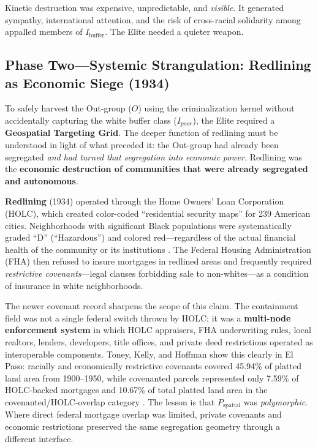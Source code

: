 Kinetic destruction was expensive, unpredictable, and \textit{visible}. It generated sympathy, international attention, and the risk of cross-racial solidarity among appalled members of $I_{\text{buffer}}$. The Elite needed a quieter weapon.

\subsection{Phase Two---Systemic Strangulation: Redlining as Economic Siege (1934)}

To safely harvest the Out-group ($O$) using the criminalization kernel without accidentally capturing the white buffer class ($I_{poor}$), the Elite required a \textbf{Geospatial Targeting Grid}. The deeper function of redlining must be understood in light of what preceded it: the Out-group had already been segregated \textit{and had turned that segregation into economic power}. Redlining was the \textbf{economic destruction of communities that were already segregated and autonomous}.

\textbf{Redlining} (1934) operated through the Home Owners' Loan Corporation (HOLC), which created color-coded ``residential security maps'' for 239 American cities. Neighborhoods with significant Black populations were systematically graded ``D'' (``Hazardous'') and colored red---regardless of the actual financial health of the community or its institutions \cite{rothstein, coatesreparations}. The Federal Housing Administration (FHA) then refused to insure mortgages in redlined areas and frequently required \textit{restrictive covenants}---legal clauses forbidding sale to non-whites---as a condition of insurance in white neighborhoods.

The newer covenant record sharpens the scope of this claim. The containment field was not a single federal switch thrown by HOLC; it was a \textbf{multi-node enforcement system} in which HOLC appraisers, FHA underwriting rules, local realtors, lenders, developers, title offices, and private deed restrictions operated as interoperable components. Toney, Kelly, and Hoffman show this clearly in El Paso: racially and economically restrictive covenants covered 45.94\% of platted land area from 1900--1950, while covenanted parcels represented only 7.59\% of HOLC-backed mortgages and 10.67\% of total platted land area in the covenanted/HOLC-overlap category \cite{toney_housing_covenants_2026}. The lesson is that $P_{\text{spatial}}$ was \textit{polymorphic}. Where direct federal mortgage overlap was limited, private covenants and economic restrictions preserved the same segregation geometry through a different interface.

